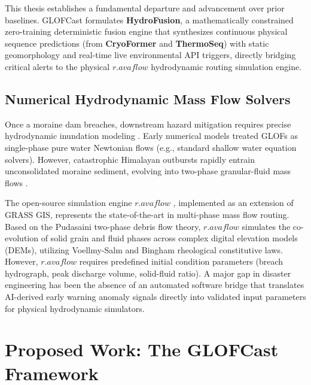 \documentclass{mnnit}
\begin{document}
This thesis establishes a fundamental departure and advancement over prior baselines. GLOFCast formulates \textbf{HydroFusion}, a mathematically constrained zero-training deterministic fusion engine that synthesizes continuous physical sequence predictions (from \textbf{CryoFormer} and \textbf{ThermoSeq}) with static geomorphology and real-time live environmental API triggers, directly bridging critical alerts to the physical $r.avaflow$ hydrodynamic routing simulation engine.

\section{Numerical Hydrodynamic Mass Flow Solvers}
Once a moraine dam breaches, downstream hazard mitigation requires precise hydrodynamic inundation modeling \cite{mergili2020ravaflow}. Early numerical models treated GLOFs as single-phase pure water Newtonian flows (e.g., standard shallow water equation solvers). However, catastrophic Himalayan outbursts rapidly entrain unconsolidated moraine sediment, evolving into two-phase granular-fluid mass flows \cite{cui2014mechanism, sattar2021numerical}.

The open-source simulation engine $r.avaflow$ \cite{mergili2020ravaflow}, implemented as an extension of GRASS GIS, represents the state-of-the-art in multi-phase mass flow routing. Based on the Pudasaini two-phase debris flow theory, $r.avaflow$ simulates the co-evolution of solid grain and fluid phases across complex digital elevation models (DEMs), utilizing Voellmy-Salm and Bingham rheological constitutive laws. However, $r.avaflow$ requires predefined initial condition parameters (breach hydrograph, peak discharge volume, solid-fluid ratio). A major gap in disaster engineering has been the absence of an automated software bridge that translates AI-derived early warning anomaly signals directly into validated input parameters for physical hydrodynamic simulators.


\chapter{Proposed Work: The GLOFCast Framework}
\end{document}
